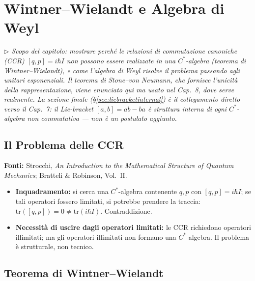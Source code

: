\documentclass[12pt, a4paper]{article}
\newcommand{\fonti}[1]{%
	\begin{fontebox}
		\textcolor{fontecolor}{\footnotesize\textbf{Fonti:} #1}
	\end{fontebox}%
}
\newcommand{\nota}[1]{%
	\par\smallskip
	\noindent\textit{\small $\triangleright$\; #1}
	\par\smallskip
}
\begin{document}
	\newpage
	\section{Wintner--Wielandt e Algebra di Weyl}
	
	\nota{Scopo del capitolo: mostrare perché le relazioni di commutazione canoniche
		(CCR) $[q,p] = i\hbar I$ non possono essere realizzate in una $C^*$-algebra
		(teorema di Wintner--Wielandt), e come l'algebra di Weyl risolve il problema
		passando agli unitari esponenziali. Il teorema di Stone--von Neumann, che fornisce
		l'unicità della rappresentazione, viene enunciato qui ma \emph{usato} nel Cap.\ 8,
		dove serve realmente. La sezione finale (§\ref{sec:liebracketinternal}) è il
		collegamento diretto verso il Cap.\ 7: il Lie-bracket $[a,b] = ab - ba$ è struttura
		interna di ogni $C^*$-algebra non commutativa --- non è un postulato aggiunto.}
	
	\subsection{Il Problema delle CCR}
	
	\fonti{Strocchi, \textit{An Introduction to the Mathematical Structure of Quantum
			Mechanics}; Bratteli \& Robinson, Vol.~II.}
	
	\begin{itemize}
		\item \textbf{Inquadramento:} si cerca una $C^*$-algebra contenente $q, p$ con
		$[q, p] = i\hbar I$; se tali operatori fossero limitati, si potrebbe prendere
		la traccia: $\mathrm{tr}([q,p]) = 0 \neq \mathrm{tr}(i\hbar I)$. Contraddizione.
		\item \textbf{Necessità di uscire dagli operatori limitati:} le CCR richiedono
		operatori illimitati; ma gli operatori illimitati non formano una $C^*$-algebra.
		Il problema è strutturale, non tecnico.
	\end{itemize}
	
	\subsection{Teorema di Wintner--Wielandt}
	
\end{document}
